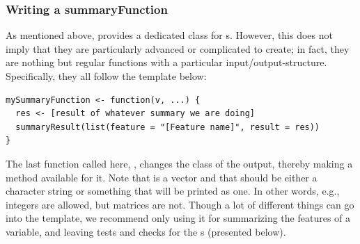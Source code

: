 \documentclass[article,shortnames]{jss}
\newcommand{\hl}[1]{\textcolor{magenta}{#1}}
\begin{document}

\subsubsection{Writing a summaryFunction}
As mentioned above,  provides a dedicated class for
s. However, this does not imply that they are
particularly advanced or complicated to create; in fact, they are
nothing but regular functions with a particular
input/output-structure. Specifically, they all follow the template
below:
\begin{Verbatim}
mySummaryFunction <- function(v, ...) {
  res <- [result of whatever summary we are doing]
  summaryResult(list(feature = "[Feature name]", result = res))
}
\end{Verbatim}
The last function called here, , changes the class
of the output, thereby making a  method available for it.
Note that  is a vector and that  should be either a
character string or something that will be printed as one. In other
words, e.g., integers are allowed, but matrices are not. Though a lot
of different things can go into the  template,
we recommend only using it for summarizing the features of a variable,
and leaving tests and checks for the s (presented
below).
\end{document}
